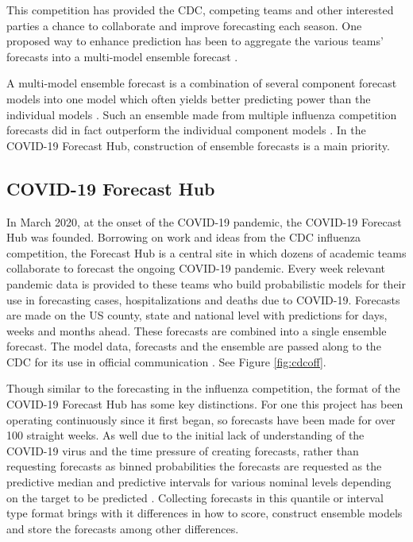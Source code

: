 \documentclass[11pt,notitlepage]{isuthesis}
\begin{document}
This competition has provided the CDC, competing teams and other interested
parties a chance to collaborate and improve forecasting each season. One 
proposed way to enhance prediction has been to aggregate the various teams'
forecasts into a multi-model ensemble forecast 
\cite{mcgowan2019collaborative,mcandrew2019adaptively,reich2019accuracy}.

A multi-model ensemble forecast is a combination of several component forecast 
models into one model which often yields better predicting power than the 
individual models \cite{cramer2021evaluation}. Such an ensemble made from 
multiple influenza competition forecasts did in fact outperform the individual 
component models \cite{reich2019accuracy}.
In the COVID-19 Forecast Hub, construction of ensemble forecasts is a main
priority.



\subsection{COVID-19 Forecast Hub}
In March 2020, at the onset of the COVID-19 pandemic, the COVID-19 Forecast Hub
was founded. Borrowing on work and 
ideas from the CDC influenza competition, the Forecast Hub is a central site in 
which dozens of academic teams collaborate to forecast the ongoing COVID-19 
pandemic.
Every week relevant
pandemic data is provided to these teams who build probabilistic models for 
their use in
forecasting cases, hospitalizations and deaths due to COVID-19. Forecasts are 
made on the US county,
state and national level with predictions for days, weeks and months ahead.
These forecasts are combined into a single ensemble forecast. The model data,
forecasts and the ensemble are passed along to the CDC for its use in official
communication \cite{Cramer2021-hub-dataset}. See Figure \ref{fig:cdcoff}.

Though similar to the forecasting in the influenza competition, the format of 
the COVID-19 Forecast Hub has some key distinctions. For one this project has
been operating continuously since it first began, so forecasts have been made
for over 100 straight weeks. 
As well due to the initial lack of understanding of the COVID-19 virus and the 
time 
pressure of
creating forecasts, rather than requesting forecasts as binned probabilities
the forecasts are requested as the predictive median and 
predictive intervals for various nominal levels depending on the target to be
predicted \cite{bracher2021evaluating}. Collecting forecasts in this quantile
or interval type format brings with it differences in how to score, construct 
ensemble
models and store the forecasts among other differences.
\end{document}
